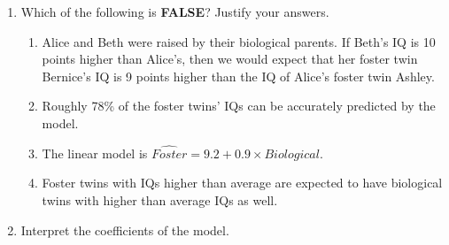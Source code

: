 \documentclass[10pt]{article}\usepackage[]{graphicx}\usepackage[]{color}
\begin{document}
\begin{enumerate}
\item Which of the following is \textbf{FALSE}? Justify your answers.

\begin{enumerate}
  \itemsep0.7in
\item Alice and Beth were raised by their biological parents. If Beth's IQ is 10 points higher than Alice's, then we would expect that her foster twin Bernice's IQ is 9 points higher than the IQ of Alice's foster twin Ashley. 
\item Roughly 78\% of the foster twins' IQs can be accurately predicted by the model.
\item The linear model is $\widehat{Foster} = 9.2 + 0.9 \times Biological$.
\item Foster twins with IQs higher than average are expected to have biological twins with higher than average IQs as well.
  \vspace{0.5in}
\end{enumerate}

\item Interpret the coefficients of the model. 
\end{enumerate}




\clearpage
\end{document}

